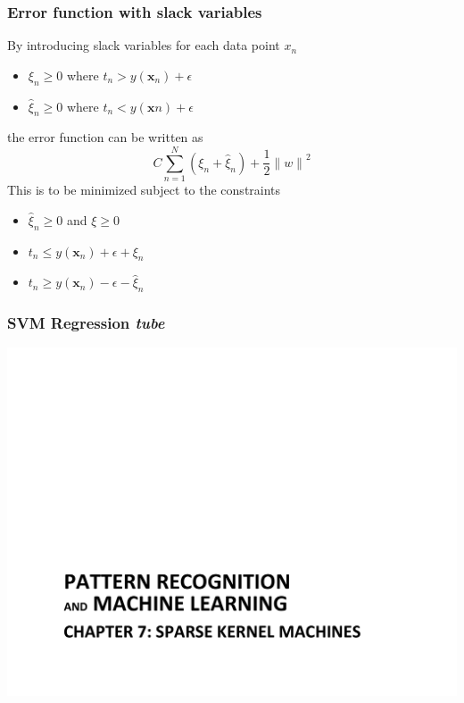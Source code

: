 \documentclass[t,14pt]{beamer}
\begin{document}
\begin{frame}
  \frametitle{Error function with slack variables}
  By introducing slack variables for each data point $x_n$\\
  \begin{itemize}
    \item {$\xi_n \geq 0$ where $t_n > y(\mathbf{x}_n) + 
  \epsilon$} 
    \item {$\widehat{\xi}_n \geq 0$ where $t_n < y(\mathbf{x}n) 
  + \epsilon$} 
  \end{itemize}
  the error function can be written as
  \begin{equation}
    C \sum\limits_{n=1}^N (\xi_n + \widehat{\xi}_n) + 
        \frac{\displaystyle 1}{\displaystyle 2}{\lVert w \rVert}^2
  \end{equation}
  This is to be minimized subject to the constraints
  \begin{itemize}
    \item {$\widehat{\xi}_n \geq 0$ and $\xi \geq 0$}
    \item {$t_n \leq y(\mathbf{x}_n) + \epsilon + \xi_n$}
    \item {$t_n \geq y(\mathbf{x}_n) - \epsilon - \widehat{\xi}_n$}
  \end{itemize}
\end{frame}

\begin{frame}
  \frametitle{SVM Regression \textit{tube}}
  \includegraphics[trim=2cm 0cm 0cm 5cm,clip,scale=0.5,page=9]{Chapter_7.pdf}
\end{frame}
\end{document}
